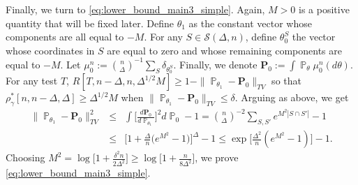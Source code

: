 \documentclass[twoside,11pt]{article}
\def\beqn{\begin{eqnarray*}}
\def\eeqn{\end{eqnarray*}}
\def\cS{\mathcal{S}}
\renewcommand{\P}{\operatorname{\mathbb{P}}}
\newcommand{\<}{\langle}
\renewcommand{\>}{\rangle}
\begin{document}
 \bigskip 
 
 Finally, we turn to \eqref{eq:lower_bound_main3_simple}. Again, $M>0$ is a positive quantity that will be fixed later. Define $\theta_1$ as the constant vector whose components are all equal to $-M$. For any $S\in \cS(\Delta,n)$, define $\theta_0^S$ the vector whose coordinates in $S$ are equal to zero and whose remaining components are equal to $-M$. Let $\mu_0^n:= \binom{n}{\Delta}^{-1}\sum_{S}\delta_{\theta_0^S}$. Finally, we denote $\mathbf{P}_0:=\int \P_{\theta}\mu_0^{n}(d\theta)$. For any test $T$,  $R[T,n-\Delta, n, \Delta^{1/2} M]\geq  1 - \|\P_{\theta_1} - \mathbf{P}_0\|_{TV}$ so that $\rho^*_{\gamma}[n,n-\Delta,\Delta]\geq \Delta^{1/2}M$ when  
 $\|\P_{\theta_1} - \mathbf{P}_0\|_{TV}\leq \delta $. Arguing  as above, we get
 \beqn 
 \|\P_{\theta_1} - \mathbf{P}_0\|_{TV}^2&\leq& \int  \Big[\frac{d\mathbf{P}_0}{d\P_{\theta_1}}\Big]^2d\P_0- 1= \binom{n}{\Delta}^{-2}\sum_{S,S'} e^{M^2 |S\cap S'|} -1 \\ 
 &\leq& \Big[1+ \frac{\Delta }{n}\big(e^{M^2}-1\big)\Big]^\Delta - 1\leq \exp\big[\frac{\Delta^2}{n}(e^{M^2}-1)\big] - 1.
 \eeqn 
 Choosing $M^2= \log\big[1  + \frac{\delta^2 n}{2\Delta^2}\big]\geq  \log\big[1  + \frac{n}{8\Delta^2}\big]$, we prove \eqref{eq:lower_bound_main3_simple}.
 
 
 
\end{document}
